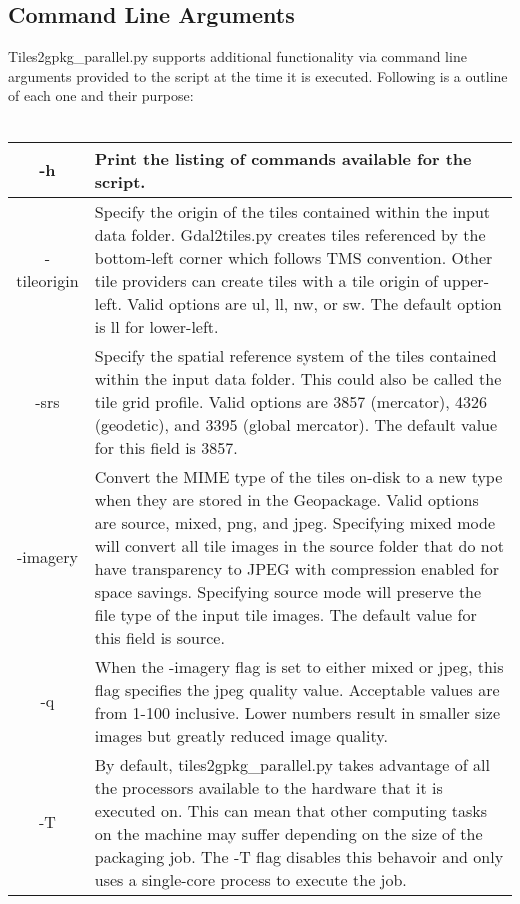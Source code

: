 \documentclass{article}
\begin{document}
\subsection{Command Line Arguments}
Tiles2gpkg\_parallel.py supports additional functionality via command line
arguments provided to the script at the time it is executed.  Following is a
outline of each one and their purpose:
\\\\
\begin{tabular}{ | c | p{14cm} | }
    \hline
    -h & Print the listing of commands available for the script.\\
    \hline
    -tileorigin & Specify the origin of the tiles contained within the input
    data folder.  Gdal2tiles.py creates tiles referenced by the bottom-left
    corner which follows TMS convention.  Other tile providers can create tiles
    with a tile origin of upper-left.  Valid options are ul, ll, nw, or sw.
    The default option is ll for lower-left.\\
    \hline
    -srs & Specify the spatial reference system of the tiles contained within
    the input data folder.  This could also be called the tile grid profile.
    Valid options are 3857 (mercator), 4326 (geodetic), and 3395 (global
    mercator).  The default value for this field is 3857.\\
    \hline
    -imagery & Convert the MIME type of the tiles on-disk to a new type when
    they are stored in the Geopackage.  Valid options are source, mixed, png,
    and jpeg.  Specifying mixed mode will convert all tile images in the source
    folder that do not have transparency to JPEG with compression enabled for
    space savings.  Specifying source mode will preserve the file type of the
    input tile images.  The default value for this field is source.\\
    \hline
    -q & When the -imagery flag is set to either mixed or jpeg, this flag
    specifies the jpeg quality value.  Acceptable values are from 1-100
    inclusive.  Lower numbers result in smaller size images but greatly reduced
    image quality.\\
    \hline
    -T & By default, tiles2gpkg\_parallel.py takes advantage of all the
    processors available to the hardware that it is executed on.  This can mean
    that other computing tasks on the machine may suffer depending on the size
    of the packaging job. The -T flag disables this behavoir and only uses a
    single-core process to execute the job.\\
    \hline
\end{tabular}
\end{document}
